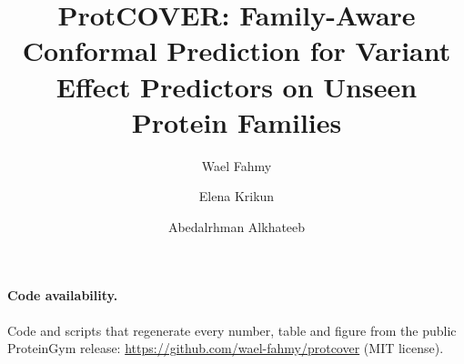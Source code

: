 \documentclass{llncs}
\newcommand{\1}{\mathbf{1}}
\begin{document}
\title{ProtCOVER: Family-Aware Conformal Prediction for Variant Effect Predictors on Unseen Protein Families}
\author{Wael Fahmy \and Elena Krikun \and Abedalrhman Alkhateeb}

\maketitle

\begin{abstract}

\end{abstract}
\clearpage %
\setcounter{page}{1}
\hypersetup{pageanchor=true}










\FloatBarrier %
\paragraph{Code availability.} Code and scripts that regenerate every number, table and figure from the public ProteinGym release: \url{https://github.com/wael-fahmy/protcover} (MIT license).




\clearpage %
\appendix
\renewcommand{\theHsection}{app.\arabic{section}} %

\end{document}
